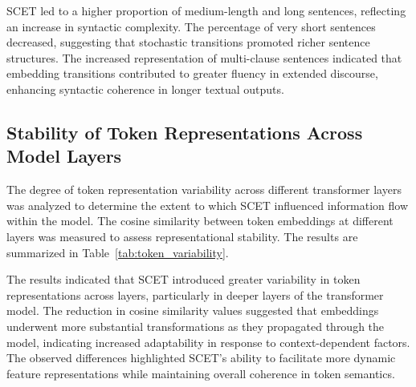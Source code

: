 \documentclass{article}
\begin{document}
SCET led to a higher proportion of medium-length and long sentences, reflecting an increase in syntactic complexity. The percentage of very short sentences decreased, suggesting that stochastic transitions promoted richer sentence structures. The increased representation of multi-clause sentences indicated that embedding transitions contributed to greater fluency in extended discourse, enhancing syntactic coherence in longer textual outputs.

\subsection{Stability of Token Representations Across Model Layers}

The degree of token representation variability across different transformer layers was analyzed to determine the extent to which SCET influenced information flow within the model. The cosine similarity between token embeddings at different layers was measured to assess representational stability. The results are summarized in Table~\ref{tab:token_variability}.

\begin{table}[h]
	\caption{Token Representation Stability Across Transformer Layers}
	\label{tab:token_variability}
	\centering
	\renewcommand{\arraystretch}{1.3}
\end{table}

The results indicated that SCET introduced greater variability in token representations across layers, particularly in deeper layers of the transformer model. The reduction in cosine similarity values suggested that embeddings underwent more substantial transformations as they propagated through the model, indicating increased adaptability in response to context-dependent factors. The observed differences highlighted SCET’s ability to facilitate more dynamic feature representations while maintaining overall coherence in token semantics.
\end{document}
